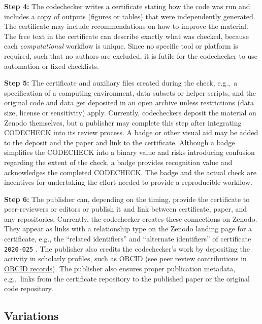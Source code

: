 \documentclass[12pt]{article}
\newcommand{\rev}[1]{\textit{#1}}
\begin{document}
\textbf{Step 4:} The codechecker writes a certificate stating how the
code was run and includes a copy of outputs (figures or tables) that
were independently generated.  The certificate may include
recommendations on how to improve the material.  The free text in the
certificate can describe exactly what was checked, because each
\rev{computational} workflow is unique.  Since no specific tool or platform is required,
such that no authors are excluded, it is futile for the
codechecker to use automation or fixed checklists.

\textbf{Step 5:} The certificate and auxiliary files created during
the check, e.g.,~a specification of a computing environment, data
subsets or helper scripts, and the original code and data get
deposited in an open archive unless restrictions (data size, license
or sensitivity) apply.  Currently, codecheckers deposit the material
on Zenodo themselves, but a publisher may complete this step after
integrating CODECHECK into its review process.  A badge or other
visual aid may be added to the deposit and the paper and link to the
certificate.  Although a badge simplifies the CODECHECK into a binary
value and risks introducing confusion regarding the extent of the
check, a badge provides recognition value and acknowledges the
completed CODECHECK.  The badge and the actual check are incentives
for undertaking the effort needed to provide a reproducible workflow.

\textbf{Step 6:} The publisher can, depending on the timing, provide
the certificate to peer-reviewers or editors or publish it and link
between certificate, paper, and any repositories. Currently, the
codechecker creates these connections on Zenodo. They appear as links
with a relationship type on the Zenodo landing page for a certificate,
e.g., the ``related identifiers'' and ``alternate identifiers'' of
certificate \texttt{2020-025} \cite{cert-2020-025}.  The publisher
also credits the codechecker's work by depositing the activity
in scholarly profiles, such as ORCID (see peer review contributions in
\href{https://support.orcid.org/hc/en-us/articles/360006971333-Peer-Review}{ORCID records}).
The publisher also ensures proper publication metadata, e.g.,~links
from the certificate repository to the published paper or the original
code repository.

\subsection*{Variations}\label{variations}
\end{document}
